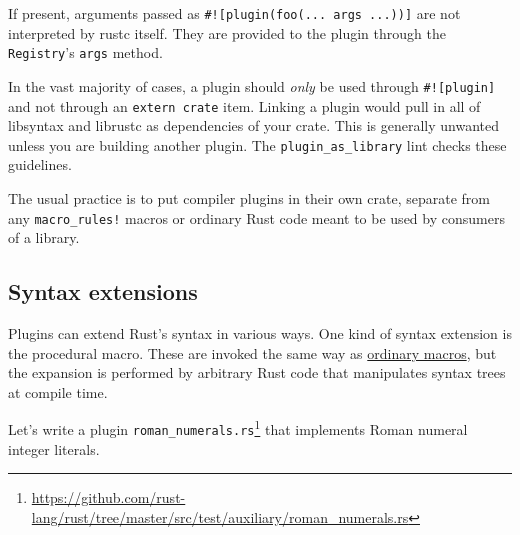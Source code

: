 \documentclass[a4paper,]{book}
\renewcommand{\href}[2]{#2\footnote{\url{#1}}}
\begin{document}
If present, arguments passed as
\texttt{\#!{[}plugin(foo(...\ args\ ...)){]}} are not interpreted by
rustc itself. They are provided to the plugin through the
\texttt{Registry}'s \texttt{args} method.

In the vast majority of cases, a plugin should \emph{only} be used
through \texttt{\#!{[}plugin{]}} and not through an
\texttt{extern\ crate} item. Linking a plugin would pull in all of
libsyntax and librustc as dependencies of your crate. This is generally
unwanted unless you are building another plugin. The
\texttt{plugin\_as\_library} lint checks these guidelines.

The usual practice is to put compiler plugins in their own crate,
separate from any \texttt{macro\_rules!} macros or ordinary Rust code
meant to be used by consumers of a library.

\subsection{Syntax extensions}\label{syntax-extensions}

Plugins can extend Rust's syntax in various ways. One kind of syntax
extension is the procedural macro. These are invoked the same way as
\protect\hyperlink{sec--macros}{ordinary macros}, but the expansion is
performed by arbitrary Rust code that manipulates syntax trees at
compile time.

Let's write a plugin
\href{https://github.com/rust-lang/rust/tree/master/src/test/auxiliary/roman_numerals.rs}{\texttt{roman\_numerals.rs}}
that implements Roman numeral integer literals.
\end{document}
